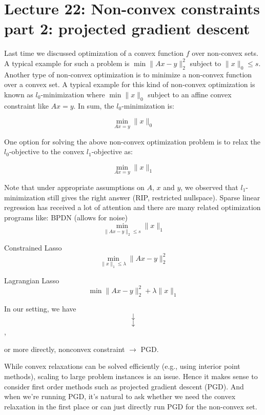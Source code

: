 

\section{Lecture 22: Non-convex constraints part 2: projected gradient descent} 


Last time we discussed optimization of a convex function $f$ over non-convex sets. A typical example for such a problem is $\min \| Ax-y\|_2^2$ subject to $\|x\|_0 \leq s$. Another type of non-convex optimization is to minimize a non-convex function over a convex set. A typical example for this kind of non-convex optimization is known as $l_0$-minimization where $\min \| x\|_0$ subject to an affine convex constraint like $Ax=y$. In sum, the $l_0$-minimization is: 

$$\min_{Ax=y} \|x\|_0$$

One option for solving the above non-convex optimization problem is to relax the $l_0$-objective to the convex $l_1$-objective as:

$$\min_{Ax=y} \|x\|_1$$





Note that under appropriate assumptions on $A$, $x$ and $y$, we observed that $l_1$-minimization still gives the right answer (RIP, restricted nullspace).
Sparse linear regression has received a lot of attention and there are many related optimization programs like:
BPDN (allows for noise)
$$\min_{\|Ax-y\|_2 \leq s} \|x\|_1$$

Constrained Lasso
$$\min_{\|x\|_1 \leq \lambda }\|Ax-y\|_2^2 $$

Lagrangian Lasso
$$\min \|Ax-y\|_2^2 +  \lambda \|x\|_1$$

In our setting, we have \\

$$\downarrow$$
$$\downarrow$$
,

or more directly, nonconvex constraint $\rightarrow$ PGD.  

While convex relaxations can be solved efficiently (e.g., using interior point methods), scaling to large problem instances is an issue. Hence it makes sense to consider first order methods such as projected gradient descent (PGD). And when we're running PGD, it's natural to ask whether we need the convex relaxation in the first place or can just directly run PGD for the non-convex set.


